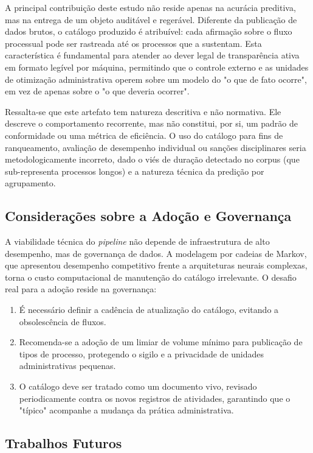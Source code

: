 A principal contribuição deste estudo não reside apenas na acurácia preditiva, mas na entrega de um objeto auditável e regerável. Diferente da publicação de dados brutos, o catálogo produzido é atribuível: cada afirmação sobre o fluxo processual pode ser rastreada até os processos que a sustentam. Esta característica é fundamental para atender ao dever legal de transparência ativa em formato legível por máquina, permitindo que o controle externo e as unidades de otimização administrativa operem sobre um modelo do "o que de fato ocorre", em vez de apenas sobre o "o que deveria ocorrer".

Ressalta-se que este artefato tem natureza descritiva e não normativa. Ele descreve o comportamento recorrente, mas não constitui, por si, um padrão de conformidade ou uma métrica de eficiência. O uso do catálogo para fins de ranqueamento, avaliação de desempenho individual ou sanções disciplinares seria metodologicamente incorreto, dado o viés de duração detectado no corpus (que sub-representa processos longos) e a natureza técnica da predição por agrupamento.

\subsection*{Considerações sobre a Adoção e Governança}

A viabilidade técnica do \emph{pipeline} não depende de infraestrutura de alto desempenho, mas de governança de dados. A modelagem por cadeias de Markov, que apresentou desempenho competitivo frente a arquiteturas neurais complexas, torna o custo computacional de manutenção do catálogo irrelevante. O desafio real para a adoção reside na governança:
\begin{enumerate}
    \item É necessário definir a cadência de atualização do catálogo, evitando a obsolescência de fluxos.
    \item Recomenda-se a adoção de um limiar de volume mínimo para publicação de tipos de processo, protegendo o sigilo e a privacidade de unidades administrativas pequenas.
    \item O catálogo deve ser tratado como um documento vivo, revisado periodicamente contra os novos registros de atividades, garantindo que o "típico" acompanhe a mudança da prática administrativa.
\end{enumerate}

\subsection*{Trabalhos Futuros}

